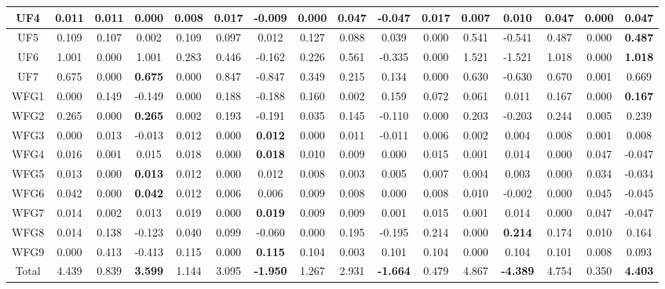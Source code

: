 \begin{table}[h]
{\begin{tabular}{|c|c|c|c|c|c|c|c|c|c|c|c|c|c|c|c|}
UF4 & 0.011 & 0.011 & 0.000 & 0.008 & 0.017 & -0.009 & 0.000 & 0.047 & -0.047 & 0.017 & 0.007 & 0.010 & 0.047 & 0.000 & \textbf{0.047} \\ \hline
UF5 & 0.109 & 0.107 & 0.002 & 0.109 & 0.097 & 0.012 & 0.127 & 0.088 & 0.039 & 0.000 & 0.541 & -0.541 & 0.487 & 0.000 & \textbf{0.487} \\ \hline
UF6 & 1.001 & 0.000 & 1.001 & 0.283 & 0.446 & -0.162 & 0.226 & 0.561 & -0.335 & 0.000 & 1.521 & -1.521 & 1.018 & 0.000 & \textbf{1.018} \\ \hline
UF7 & 0.675 & 0.000 & \textbf{0.675} & 0.000 & 0.847 & -0.847 & 0.349 & 0.215 & 0.134 & 0.000 & 0.630 & -0.630 & 0.670 & 0.001 & 0.669 \\ \hline
WFG1 & 0.000 & 0.149 & -0.149 & 0.000 & 0.188 & -0.188 & 0.160 & 0.002 & 0.159 & 0.072 & 0.061 & 0.011 & 0.167 & 0.000 & \textbf{0.167} \\ \hline
WFG2 & 0.265 & 0.000 & \textbf{0.265} & 0.002 & 0.193 & -0.191 & 0.035 & 0.145 & -0.110 & 0.000 & 0.203 & -0.203 & 0.244 & 0.005 & 0.239 \\ \hline
WFG3 & 0.000 & 0.013 & -0.013 & 0.012 & 0.000 & \textbf{0.012} & 0.000 & 0.011 & -0.011 & 0.006 & 0.002 & 0.004 & 0.008 & 0.001 & 0.008 \\ \hline
WFG4 & 0.016 & 0.001 & 0.015 & 0.018 & 0.000 & \textbf{0.018} & 0.010 & 0.009 & 0.000 & 0.015 & 0.001 & 0.014 & 0.000 & 0.047 & -0.047 \\ \hline
WFG5 & 0.013 & 0.000 & \textbf{0.013} & 0.012 & 0.000 & 0.012 & 0.008 & 0.003 & 0.005 & 0.007 & 0.004 & 0.003 & 0.000 & 0.034 & -0.034 \\ \hline
WFG6 & 0.042 & 0.000 & \textbf{0.042} & 0.012 & 0.006 & 0.006 & 0.009 & 0.008 & 0.000 & 0.008 & 0.010 & -0.002 & 0.000 & 0.045 & -0.045 \\ \hline
WFG7 & 0.014 & 0.002 & 0.013 & 0.019 & 0.000 & \textbf{0.019} & 0.009 & 0.009 & 0.001 & 0.015 & 0.001 & 0.014 & 0.000 & 0.047 & -0.047 \\ \hline
WFG8 & 0.014 & 0.138 & -0.123 & 0.040 & 0.099 & -0.060 & 0.000 & 0.195 & -0.195 & 0.214 & 0.000 & \textbf{0.214} & 0.174 & 0.010 & 0.164 \\ \hline
WFG9 & 0.000 & 0.413 & -0.413 & 0.115 & 0.000 & \textbf{0.115} & 0.104 & 0.003 & 0.101 & 0.104 & 0.000 & 0.104 & 0.101 & 0.008 & 0.093 \\ \hline
Total & 4.439 & 0.839 & \textbf{3.599} & 1.144 & 3.095 & \textbf{-1.950} & 1.267 & 2.931 & \textbf{-1.664} & 0.479 & 4.867 & \textbf{-4.389} & 4.754 & 0.350 & \textbf{4.403} \\ \hline
\end{tabular}%
}
\end{table}


